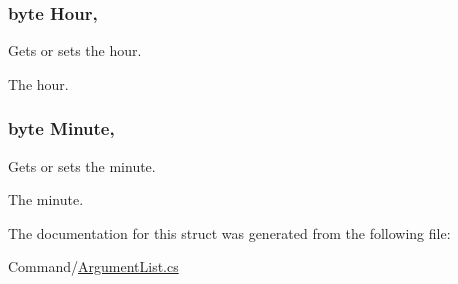 \subsubsection[{Hour}]{\setlength{\rightskip}{0pt plus 5cm}byte Hour\hspace{0.3cm}{\ttfamily [get]}, {\ttfamily [set]}}\label{structOTA_1_1Command_1_1WorldTime_aa3de14e3a386da7f7f588a6e0185e0d0}


Gets or sets the hour. 

The hour.\hypertarget{structOTA_1_1Command_1_1WorldTime_a0cdef82fcabb2fea404ae99c50eec8ec}{}
\subsubsection[{Minute}]{\setlength{\rightskip}{0pt plus 5cm}byte Minute\hspace{0.3cm}{\ttfamily [get]}, {\ttfamily [set]}}\label{structOTA_1_1Command_1_1WorldTime_a0cdef82fcabb2fea404ae99c50eec8ec}


Gets or sets the minute. 

The minute.

The documentation for this struct was generated from the following file\+:\begin{DoxyCompactItemize}
\item 
Command/\hyperlink{ArgumentList_8cs}{Argument\+List.\+cs}\end{DoxyCompactItemize}
